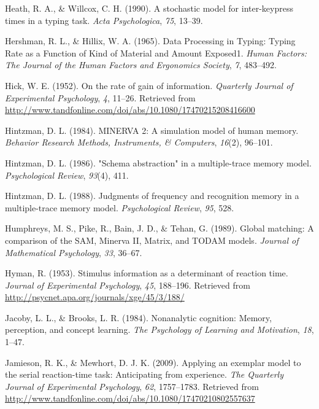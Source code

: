 \documentclass[,man,floatsintext]{apa6}
\begin{document}
\leavevmode\hypertarget{ref-heath_stochastic_1990}{}%
Heath, R. A., \& Willcox, C. H. (1990). A stochastic model for inter-keypress times in a typing task. \emph{Acta Psychologica}, \emph{75}, 13--39.

\leavevmode\hypertarget{ref-HershmanDataProcessingTyping1965}{}%
Hershman, R. L., \& Hillix, W. A. (1965). Data Processing in Typing: Typing Rate as a Function of Kind of Material and Amount Exposed1. \emph{Human Factors: The Journal of the Human Factors and Ergonomics Society}, \emph{7}, 483--492.

\leavevmode\hypertarget{ref-hick_rate_1952}{}%
Hick, W. E. (1952). On the rate of gain of information. \emph{Quarterly Journal of Experimental Psychology}, \emph{4}, 11--26. Retrieved from \url{http://www.tandfonline.com/doi/abs/10.1080/17470215208416600}

\leavevmode\hypertarget{ref-hintzman1984minerva}{}%
Hintzman, D. L. (1984). MINERVA 2: A simulation model of human memory. \emph{Behavior Research Methods, Instruments, \& Computers}, \emph{16}(2), 96--101.

\leavevmode\hypertarget{ref-hintzman1986schema}{}%
Hintzman, D. L. (1986). "Schema abstraction" in a multiple-trace memory model. \emph{Psychological Review}, \emph{93}(4), 411.

\leavevmode\hypertarget{ref-hintzman_judgments_1988}{}%
Hintzman, D. L. (1988). Judgments of frequency and recognition memory in a multiple-trace memory model. \emph{Psychological Review}, \emph{95}, 528.

\leavevmode\hypertarget{ref-humphreys_global_1989}{}%
Humphreys, M. S., Pike, R., Bain, J. D., \& Tehan, G. (1989). Global matching: A comparison of the SAM, Minerva II, Matrix, and TODAM models. \emph{Journal of Mathematical Psychology}, \emph{33}, 36--67.

\leavevmode\hypertarget{ref-hyman_stimulus_1953}{}%
Hyman, R. (1953). Stimulus information as a determinant of reaction time. \emph{Journal of Experimental Psychology}, \emph{45}, 188--196. Retrieved from \url{http://psycnet.apa.org/journals/xge/45/3/188/}

\leavevmode\hypertarget{ref-JacobyNonanalyticcognitionMemory1984}{}%
Jacoby, L. L., \& Brooks, L. R. (1984). Nonanalytic cognition: Memory, perception, and concept learning. \emph{The Psychology of Learning and Motivation}, \emph{18}, 1--47.

\leavevmode\hypertarget{ref-jamieson_applying_2009}{}%
Jamieson, R. K., \& Mewhort, D. J. K. (2009). Applying an exemplar model to the serial reaction-time task: Anticipating from experience. \emph{The Quarterly Journal of Experimental Psychology}, \emph{62}, 1757--1783. Retrieved from \url{http://www.tandfonline.com/doi/abs/10.1080/17470210802557637}
\end{document}
